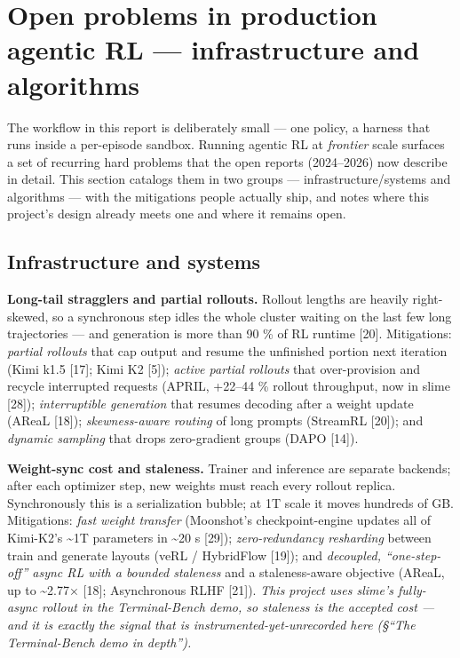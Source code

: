 \documentclass[
  paper=a4,
  ,captions=tableheading
]{scrartcl}
\begin{document}
\hypertarget{open-problems-in-production-agentic-rl-infrastructure-and-algorithms}{%
\section{Open problems in production agentic RL --- infrastructure and
algorithms}\label{open-problems-in-production-agentic-rl-infrastructure-and-algorithms}}

The workflow in this report is deliberately small --- one policy, a
harness that runs inside a per-episode sandbox. Running agentic RL at
\emph{frontier} scale surfaces a set of recurring hard problems that the
open reports (2024--2026) now describe in detail. This section catalogs
them in two groups --- infrastructure/systems and algorithms --- with
the mitigations people actually ship, and notes where this project's
design already meets one and where it remains open.

\hypertarget{infrastructure-and-systems}{%
\subsection{Infrastructure and
systems}\label{infrastructure-and-systems}}

\textbf{Long-tail stragglers and partial rollouts.} Rollout lengths are
heavily right-skewed, so a synchronous step idles the whole cluster
waiting on the last few long trajectories --- and generation is more
than 90 \% of RL runtime {[}20{]}. Mitigations: \emph{partial rollouts}
that cap output and resume the unfinished portion next iteration (Kimi
k1.5 {[}17{]}; Kimi K2 {[}5{]}); \emph{active partial rollouts} that
over-provision and recycle interrupted requests (APRIL, +22--44 \%
rollout throughput, now in slime {[}28{]}); \emph{interruptible
generation} that resumes decoding after a weight update (AReaL
{[}18{]}); \emph{skewness-aware routing} of long prompts (StreamRL
{[}20{]}); and \emph{dynamic sampling} that drops zero-gradient groups
(DAPO {[}14{]}).

\textbf{Weight-sync cost and staleness.} Trainer and inference are
separate backends; after each optimizer step, new weights must reach
every rollout replica. Synchronously this is a serialization bubble; at
1T scale it moves hundreds of GB. Mitigations: \emph{fast weight
transfer} (Moonshot's checkpoint-engine updates all of Kimi-K2's
\textasciitilde1T parameters in \textasciitilde20 s {[}29{]});
\emph{zero-redundancy resharding} between train and generate layouts
(veRL / HybridFlow {[}19{]}); and \emph{decoupled, ``one-step-off''
async RL with a bounded staleness} and a staleness-aware objective
(AReaL, up to \textasciitilde2.77× {[}18{]}; Asynchronous RLHF
{[}21{]}). \emph{This project uses slime's fully-async rollout in the
Terminal-Bench demo, so staleness is the accepted cost --- and it is
exactly the signal that is instrumented-yet-unrecorded here (§``The
Terminal-Bench demo in depth'').}
\end{document}

